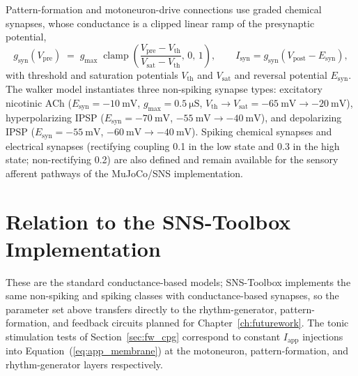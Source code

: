 Pattern-formation and motoneuron-drive connections use graded chemical
synapses, whose conductance is a clipped linear ramp of the presynaptic
potential,
\begin{equation}
    g_{\text{syn}}(V_{\text{pre}})
    \;=\; g_{\text{max}}\;
    \operatorname{clamp}\!\left(
        \frac{V_{\text{pre}} - V_{\text{th}}}{V_{\text{sat}} - V_{\text{th}}},
        \,0,\,1\right),
    \qquad
    I_{\text{syn}} = g_{\text{syn}}\left(V_{\text{post}} - E_{\text{syn}}\right),
    \label{eq:app_nonsyn}
\end{equation}
with threshold and saturation potentials $V_{\text{th}}$ and $V_{\text{sat}}$
and reversal potential $E_{\text{syn}}$. The walker model instantiates three
non-spiking synapse types: excitatory nicotinic ACh
($E_{\text{syn}} = \qty{-10}{\mV}$, $g_{\text{max}} = \qty{0.5}{\micro\siemens}$,
$V_{\text{th}} \to V_{\text{sat}} = \qty{-65}{\mV} \to \qty{-20}{\mV}$),
hyperpolarizing IPSP ($E_{\text{syn}} = \qty{-70}{\mV}$,
$\qty{-55}{\mV} \to \qty{-40}{\mV}$), and depolarizing IPSP
($E_{\text{syn}} = \qty{-55}{\mV}$,
$\qty{-60}{\mV} \to \qty{-40}{\mV}$). Spiking chemical synapses and electrical
synapses (rectifying coupling 0.1 in the low state and 0.3 in the high state;
non-rectifying 0.2) are also defined and remain available for the sensory
afferent pathways of the MuJoCo/SNS implementation.

\section{Relation to the SNS-Toolbox Implementation}

These are the standard conductance-based models; SNS-Toolbox
\citep{nourse_sns_2023} implements the same non-spiking and spiking classes
with conductance-based synapses, so the parameter set above transfers directly
to the rhythm-generator, pattern-formation, and feedback circuits planned for
Chapter~\ref{ch:futurework}. The tonic stimulation tests of
Section~\ref{sec:fw_cpg} correspond to constant $I_{\text{app}}$ injections
into Equation~(\ref{eq:app_membrane}) at the motoneuron, pattern-formation, and
rhythm-generator layers respectively.
